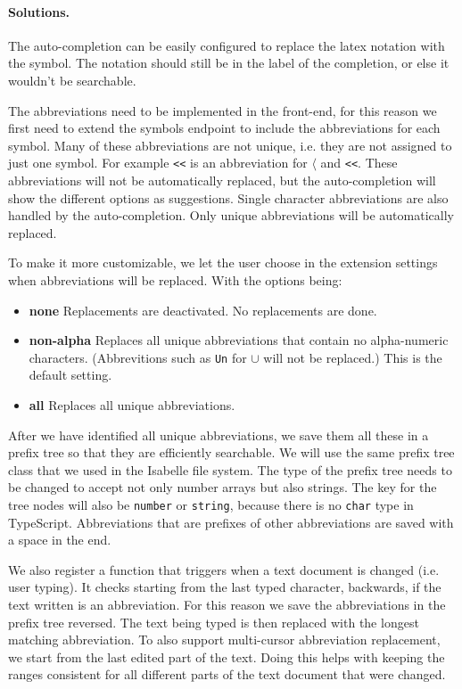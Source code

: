 \paragraph{Solutions.}
The auto-completion can be easily configured to replace the latex notation with the symbol. The notation should still be in the label of the completion, or else it wouldn't be searchable.

The abbreviations need to be implemented in the front-end, for this reason we first need to extend the symbols endpoint to include the abbreviations for each symbol. Many of these abbreviations are not unique, i.e. they are not assigned to just one symbol. For example \texttt{<{}<} is an abbreviation for $\langle$ and \texttt{<<}. These abbreviations will not be automatically replaced, but the auto-completion will show the different options as suggestions. Single character abbreviations are also handled by the auto-completion. Only unique abbreviations will be automatically replaced.

To make it more customizable, we let the user choose in the extension settings when abbreviations will be replaced. With the options being:
\begin{itemize}
    \item\textbf{none} Replacements are deactivated. No replacements are done.
    \item\textbf{non-alpha} Replaces all unique abbreviations that contain no alpha-numeric characters. (Abbrevitions such as \texttt{Un} for $\cup$ will not be replaced.) This is the default setting. 
    \item\textbf{all} Replaces all unique abbreviations.
\end{itemize}

After we have identified all unique abbreviations, we save them all these in a prefix tree so that they are efficiently searchable. We will use the same prefix tree class that we used in the Isabelle file system. The type of the prefix tree needs to be changed to accept not only number arrays but also strings. The key for the tree nodes will also be \texttt{number} or \texttt{string}, because there is no \texttt{char} type in TypeScript. Abbreviations that are prefixes of other abbreviations are saved with a space in the end. 

We also register a function that triggers when a text document is changed (i.e. user typing). It checks starting from the last typed character, backwards, if the text written is an abbreviation. For this reason we save the abbreviations in the prefix tree reversed. The text being typed is then replaced with the longest matching abbreviation. To also support multi-cursor abbreviation replacement, we start from the last edited part of the text. Doing this helps with keeping the ranges consistent for all different parts of the text document that were changed.

